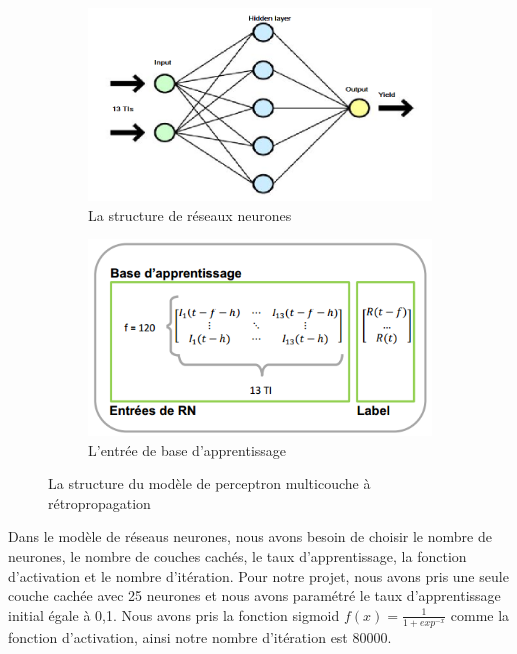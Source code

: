 \begin{figure}[H]
	\centering
	\begin{subfigure}{.5\textwidth}
	\includegraphics[width=.9\linewidth, scale=0.2]
	{plot/RN.png}
	\caption{La structure de réseaux neurones}
	\label{fig:RN}
	\end{subfigure}%
	\begin{subfigure}{.5\textwidth}
	\centering
	\includegraphics[width=.9\linewidth, scale=0.2]
	{plot/base.png}
	\caption{L'entrée de base d'apprentissage}
	\label{fig:base}
	\end{subfigure}
\caption{La structure du modèle de perceptron multicouche à rétropropagation}
\label{fig:structure_rn}
\end{figure}

Dans le modèle de réseaus neurones, nous avons besoin de choisir le nombre de neurones, le nombre de couches cachés, le taux d'apprentissage, la fonction d’activation et le nombre d'itération. Pour notre projet, nous avons pris une seule couche cachée avec 25 neurones et nous avons paramétré le taux d'apprentissage initial égale à 0,1. Nous avons pris la fonction sigmoid $ f(x) = \frac{1}{1 + exp^{-x}} $ comme la fonction d'activation, ainsi notre nombre d'itération est 80000.


